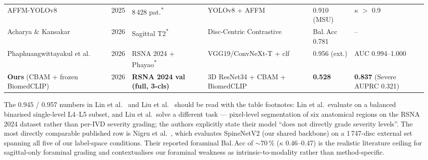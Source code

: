 \begin{table}[t]
\begin{tabular}{@{}llllll@{}}
AFFM-YOLOv8~\cite{liu2025affmyolo}                     & 2025 & 8\,428 pat.\textsuperscript{*} & YOLOv8 + AFFM             & 0.910 (MSU) & $\kappa$ $>$ 0.9 \\
Acharya \& Kansakar~\cite{acharya2026disccentric}      & 2026 & Sagittal T2\textsuperscript{*} & Disc-Centric Contrastive  & Bal.\,Acc 0.781 & -- \\
Phaphuangwittayakul et al.~\cite{phaphuangwittayakul2026multitask} & 2026 & RSNA 2024 + Phayao\textsuperscript{*} & VGG19/ConvNeXt-T + clf  & 0.956 (ext.) & AUC 0.994--1.000 \\
\midrule
\textbf{Ours} (CBAM + frozen BiomedCLIP)               & 2026 & \textbf{RSNA 2024 val (full, 3-cls)} & 3D ResNet34 + CBAM + BiomedCLIP & \textbf{0.528} & \textbf{0.837} (Severe AUPRC 0.321) \\
\bottomrule
\end{tabular}
\end{table}

The 0.945 / 0.957 numbers in Lin et al.~\cite{lin2024multiattention} and
Liu et al.~\cite{liu2025rsna} should be read with the table footnotes:
Lin et al.\ evaluate on a balanced binarised single-level L4--L5 subset,
and Liu et al.\ solve a different task — pixel-level segmentation of six
anatomical regions on the RSNA 2024 dataset rather than per-IVD severity
grading; the authors explicitly state their model ``does not directly
grade severity levels''.
The most directly comparable published row is
Nigru et al.~\cite{nigru2024spinenetv2}, which evaluates SpineNetV2 (our
shared backbone) on a 1\,747-disc external set spanning all five of our
label-space conditions. Their reported foraminal Bal.\,Acc of $\sim70\,\%$
($\kappa$ 0.46--0.47) is the realistic literature ceiling for sagittal-only
foraminal grading and contextualises our foraminal weakness as
intrinsic-to-modality rather than method-specific.

